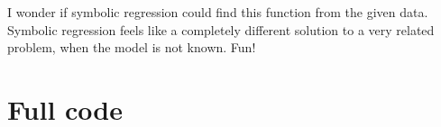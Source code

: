 \documentclass[pre,twocolumn,twoside,byrevtex,superscriptaddress]{revtex4}
\begin{document}
I wonder if symbolic regression could find this function from the given data.
Symbolic regression feels like a completely different solution to a very related problem, when the model is not known.
Fun!




\clearpage
\pagebreak
\onecolumngrid

    \section*{Full code}

    
    
    



\end{document}

